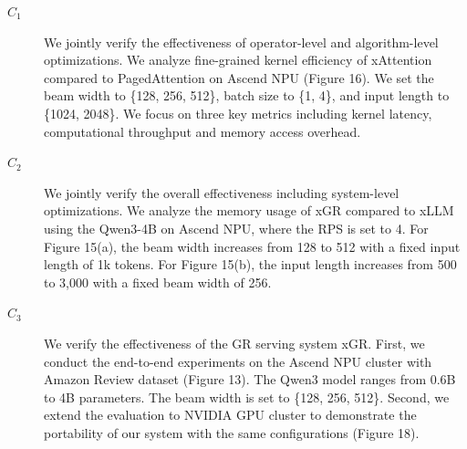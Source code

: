 \documentclass[nonacm,sigconf]{acmart}
\begin{document}
\artrel
\begin{description}

\item[$C_1$] We jointly verify the effectiveness of operator-level and algorithm-level optimizations. We analyze fine-grained kernel efficiency of xAttention compared to PagedAttention on Ascend NPU (Figure 16). We set the beam width to \{128, 256, 512\}, batch size to \{1, 4\}, and input length to \{1024, 2048\}. We focus on three key metrics including kernel latency, computational throughput and memory access overhead.

\item[$C_2$]  We jointly verify the overall effectiveness including system-level optimizations. We analyze the memory usage of xGR compared to xLLM using the Qwen3-4B on Ascend NPU, where the RPS is set to 4. For Figure 15(a), the beam width increases from 128 to 512 with a fixed input length of 1k tokens. For Figure 15(b), the input length increases from 500 to 3,000 with a fixed beam width of 256.


\item[$C_3$] We verify the effectiveness of the GR serving system xGR. First, we conduct the end-to-end experiments on the Ascend NPU cluster with Amazon Review dataset (Figure 13). The Qwen3 model ranges from 0.6B to 4B parameters. The beam width is set to \{128, 256, 512\}. Second, we extend the evaluation to NVIDIA GPU cluster to demonstrate the portability of our system with the same configurations (Figure 18).

\end{description}


\artexp
\end{document}
